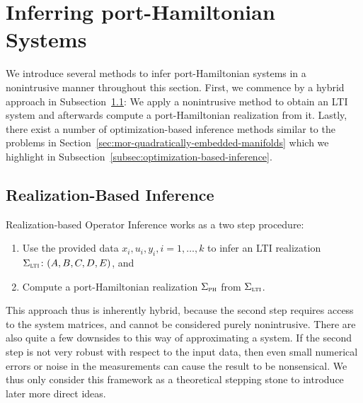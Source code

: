 \section{Inferring port-Hamiltonian Systems}\label{sec:inferring-ph-systems}

We introduce several methods to infer port-Hamiltonian systems in a nonintrusive manner throughout this section.
First, we commence by a hybrid approach in Subsection~\ref{subsec:realization-based-inference}: We apply a nonintrusive method to obtain an LTI system and afterwards compute a port-Hamiltonian realization from it.
Lastly, there exist a number of optimization-based inference methods similar to the problems in Section~\ref{sec:mor-quadratically-embedded-manifolds} which we highlight in Subsection~\ref{subsec:optimization-based-inference}.

\subsection{Realization-Based Inference}\label{subsec:realization-based-inference}

Realization-based Operator Inference works as a two step procedure:
\begin{enumerate}
    \item Use the provided data $x_i, u_i, y_i, i = 1, \dots, k$ to infer an LTI realization $\Sigma_{\textnormal{\scshape lti}} \colon (A, B, C, D, E)$, and
    \item Compute a port-Hamiltonian realization $\Sigma_{\textnormal{\scshape ph}}$ from $\Sigma_{\textnormal{\scshape lti}}$.
\end{enumerate}
This approach thus is inherently hybrid, because the second step requires access to the system matrices, and cannot be considered purely nonintrusive.
There are also quite a few downsides to this way of approximating a system.
If the second step is not very robust with respect to the input data, then even small numerical errors or noise in the measurements can cause the result to be nonsensical.
We thus only consider this framework as a theoretical stepping stone to introduce later more direct ideas.



